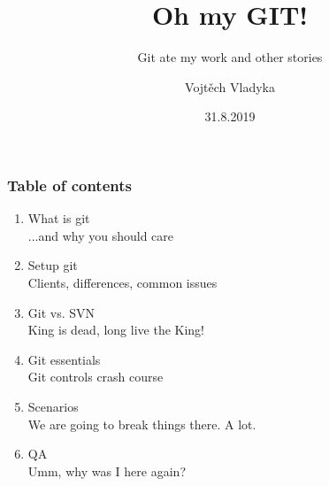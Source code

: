 \documentclass{beamer}
\title{Oh my GIT!}
\subtitle{Git ate my work and other stories}
\author{Vojtěch Vladyka}
\date{31.8.2019}
\begin{document}
    \frame{\titlepage}
    \begin{frame}
       \frametitle{Table of contents}
       \begin{enumerate}
           \item What is git
           \\   \textcolor{solarizedRebase01}{\footnotesize\hspace{1em} ...and why you should care}	
           \item Setup git
           \\   \textcolor{solarizedRebase01}{\footnotesize\hspace{1em} Clients, differences, common issues}	
           \item Git vs. SVN
           \\   \textcolor{solarizedRebase01}{\footnotesize\hspace{1em} King is dead, long live the King!}	
           \item Git essentials
           \\   \textcolor{solarizedRebase01}{\footnotesize\hspace{1em} Git controls crash course}	
           \item Scenarios
           \\   \textcolor{solarizedRebase01}{\footnotesize\hspace{1em} We are going to break things there. A lot.}	
           \item QA
           \\   \textcolor{solarizedRebase01}{\footnotesize\hspace{1em} Umm, why was I here again?}
       \end{enumerate}
    \end{frame}
    
\end{document}
